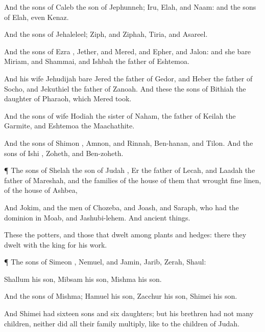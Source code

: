 {And the
sons of
Caleb the
son of
Jephunneh;
Iru,
Elah, and
Naam: and the
sons of
Elah, even
Kenaz.

And the
sons of
Jehaleleel;
Ziph, and
Ziphah,
Tiria, and
Asareel.

And the
sons of
Ezra
{},
Jether, and
Mered, and
Epher, and
Jalon: and she
bare
Miriam, and
Shammai, and
Ishbah the
father of
Eshtemoa.

And his
wife
Jehudijah
bare
Jered the
father of
Gedor, and
Heber the
father of
Socho, and
Jekuthiel the
father of
Zanoah. And these
{} the
sons of
Bithiah the
daughter of
Pharaoh, which
Mered
took.

And the
sons of
{}
wife
Hodiah the
sister of
Naham, the
father of
Keilah the
Garmite, and
Eshtemoa the
Maachathite.

And the
sons of
Shimon
{},
Amnon, and
Rinnah,
Ben-hanan, and
Tilon. And the
sons of
Ishi
{},
Zoheth, and
Ben-zoheth.


\par }{\PP {}¶ The
sons of
Shelah the
son of
Judah
{},
Er the
father of
Lecah, and
Laadah the
father of
Mareshah, and the
families of the
house of them that
wrought fine
linen, of the
house of
Ashbea,

And
Jokim, and the
men of
Chozeba, and
Joash, and
Saraph, who had the
dominion in
Moab, and
Jashubi-lehem. And
{}
ancient
things.

These
{} the
potters, and those that
dwelt among
plants and
hedges: there they
dwelt with the
king for his
work.


\par }{\PP {}¶ The
sons of
Simeon
{},
Nemuel, and
Jamin,
Jarib,
Zerah,
{}
Shaul:

Shallum his
son,
Mibsam his
son,
Mishma his
son.

And the
sons of
Mishma;
Hamuel his
son,
Zacchur his
son,
Shimei his
son.

And
Shimei had
sixteen
sons and
six
daughters; but his
brethren had not
many
children, neither did all their
family
multiply, like to the
children of
Judah.

}
